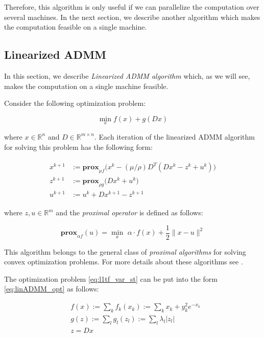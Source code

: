 \documentclass[review]{elsarticle}
\begin{document}
Therefore, this algorithm is only useful if we can parallelize the computation over several machines. In the next section, we describe another algorithm which makes the computation feasible on a single machine.

\subsection{Linearized ADMM}
\label{sec:linADMM}

In this section, we describe \textit{Linearized ADMM algorithm} \cite{parikh_proximal_2014} which, as we will see, makes the computation on a single machine feasible.

Consider the following optimization problem:

\begin{equation}
\min_x f(x)+g(Dx)
\label{eq:linADMM_opt}
\end{equation} 

\noindent where $x\in \mathbb{R}^n$ and $D\in \mathbb{R}^{m\times n}$. Each iteration of the linearized ADMM algorithm for solving this problem has the following form:

\begin{eqnarray}
\begin{aligned}
x^{k+1} & := \textbf{prox}_{\mu f} \big(x^k - (\mu/\rho)D^T (D x^k − z^k + u^k )\big)\\
z^{k+1} & := \textbf{prox}_{\rho g} \big(D x^k + u^k\big)\\
u^{k+1} & := u^k + D x^{k+1} - z^{k+1}
\end{aligned}
\label{eq:linADMM_steps}
\end{eqnarray}

\noindent where $z,u\in \mathbb{R}^m$ and the \textit{proximal operator} is defined as follows:

\begin{equation}
 \textbf{prox}_{\alpha f}(u) = \min_x \,\, \alpha \cdot f(x)+\frac{1}{2} \lVert x-u \rVert^2
\label{eq:linADMM_prox}
\end{equation}

This algorithm belongs to the general class of \textit{proximal algorithms} for solving convex optimization problems. For more details about these algorithms see \cite{parikh_proximal_2014}. 

The optimization problem \ref{eq:l1tf_var_st} can be put into the form \ref{eq:linADMM_opt} as follows:

\begin{equation}
\begin{aligned}
& f(x):= \sum_{k} f_k(x_k) := \sum_{k}x_k+y_{k}^2e^{-x_{k}}\\
& g(z):= \sum_{l} g_l(z_l) := \sum_{l} \lambda_l |z_l|\\
& z= Dx
\end{aligned}
\label{eq:linADMM_fg}
\end{equation}
\end{document}
